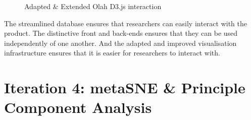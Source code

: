 \documentclass[a4paper,11pt,titlepage]{article}
\begin{document}
	\begin{figure}[H]
    			\caption{Adapted \& Extended Olah D3.js interaction}%
	\end{figure}	
	
	\par 
	The streamlined database ensures that researchers can easily interact with the product. The distinctive front and back-ends ensures that they can be used independently of one another. And the adapted and improved visualisation infrastructure ensures that it is easier for researchers to interact with.
	
	\clearpage 
	
\section{Iteration 4: metaSNE \& Principle Component Analysis}
	
\end{document}
